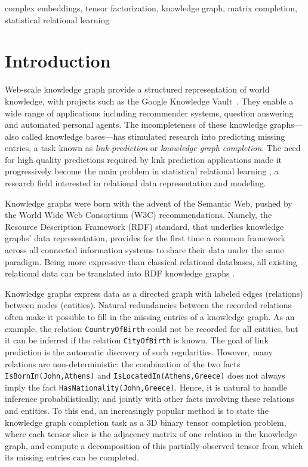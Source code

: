 \documentclass[twoside,11pt]{article}
\renewcommand{\cite}{\citep}
\def\tt{\texttt}
\begin{document}
\begin{keywords}
complex embeddings, tensor factorization, knowledge graph, matrix completion, statistical relational learning
\end{keywords}



\section{Introduction}


Web-scale knowledge graph provide a structured representation of world knowledge, with projects such as the Google Knowledge Vault~\cite{Dong:2014:KnowledgeVault}. 
They enable a wide range of applications including recommender systems, question answering and automated personal agents. The incompleteness of these knowledge graphs---also called knowledge bases---has stimulated research into predicting missing entries, a task known as \emph{link prediction} or \emph{knowledge graph completion}. 
The need for high quality predictions required by link prediction applications made 
it progressively become the main problem in statistical relational learning \cite{Getoor2007}, 
a research field interested in relational data representation and modeling.







Knowledge graphs were born with the advent of the Semantic Web, pushed
by the World Wide Web Consortium (W3C) recommendations. Namely,
the Resource Description Framework (RDF) standard, that underlies
knowledge graphs' data representation, provides for the first time
a common framework across all connected information systems
to share their data under the same paradigm. 
Being more expressive than classical relational databases,
all existing relational data can be translated into RDF knowledge graphs \cite{sahoo2009survey}.

Knowledge graphs express data as a directed graph with labeled edges (relations) between nodes (entities). Natural redundancies between the recorded relations often make it possible to fill in the missing entries of a knowledge graph. 
As an example, the relation \tt{CountryOfBirth} could not be recorded for all entities, 
but it can be inferred if the relation \tt{CityOfBirth} is known. 
The goal of link prediction is the automatic discovery of such regularities. However, many relations are non-deterministic:  the combination of the two facts \tt{IsBornIn(John,Athens)} and \tt{IsLocatedIn(Athens,Greece)} does not always imply the fact \tt{HasNationality(John,Greece)}. 
Hence, it is natural to handle inference probabilistically, and jointly with 
other facts involving these relations and entities.
To this end, an increasingly popular method is to state the knowledge 
graph completion task as a 3D binary tensor completion problem, where 
each tensor slice is the adjacency matrix of one relation in the 
knowledge graph, and compute a decomposition of this partially-observed tensor
from which its missing entries can be completed.
\end{document}

